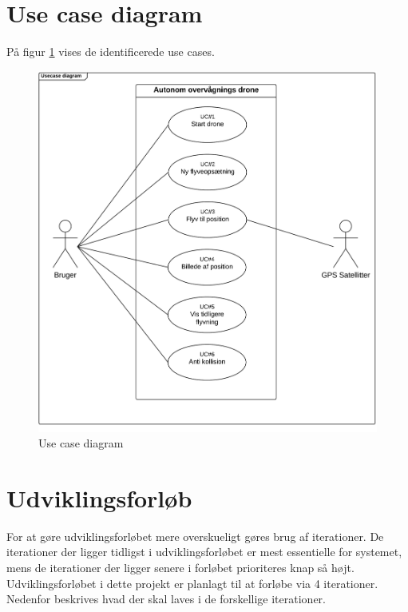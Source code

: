\newpage 

\section{Use case diagram}
\label{subsec:useCaseDiagram}
På figur \ref{fig:UCD} vises de identificerede use cases.
\vspace{-5pt}
\begin{figure}[H]
\includegraphics[width=1\textwidth]{Billeder/Use_case_diagram.png}
\vspace{-0.8cm}
\caption{Use case diagram}
\label{fig:UCD}
\end{figure}




\newpage
\section{Udviklingsforløb}

For at gøre udviklingsforløbet mere overskueligt gøres brug af iterationer.
De iterationer der ligger tidligst i udviklingsforløbet er mest essentielle for systemet, 
mens de iterationer der ligger senere i forløbet prioriteres knap så højt.
Udviklingsforløbet i dette projekt er planlagt til at forløbe via 4 iterationer. Nedenfor beskrives hvad der skal laves i de forskellige iterationer. \\

